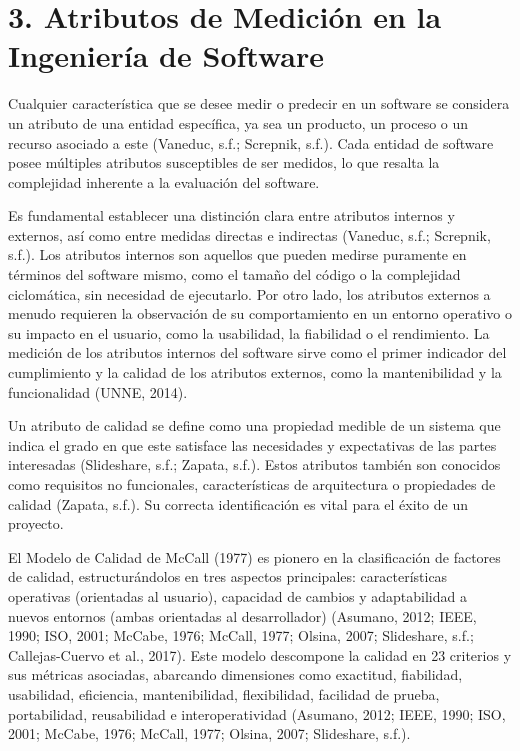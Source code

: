 \documentclass[11pt]{article}
\begin{document}
\section{3. Atributos de Medición en la Ingeniería de Software}

Cualquier característica que se desee medir o predecir en un software se considera un atributo de una entidad específica, ya sea un producto, un proceso o un recurso asociado a este (Vaneduc, s.f.; Screpnik, s.f.). Cada entidad de software posee múltiples atributos susceptibles de ser medidos, lo que resalta la complejidad inherente a la evaluación del software.

Es fundamental establecer una distinción clara entre atributos internos y externos, así como entre medidas directas e indirectas (Vaneduc, s.f.; Screpnik, s.f.). Los atributos internos son aquellos que pueden medirse puramente en términos del software mismo, como el tamaño del código o la complejidad ciclomática, sin necesidad de ejecutarlo. Por otro lado, los atributos externos a menudo requieren la observación de su comportamiento en un entorno operativo o su impacto en el usuario, como la usabilidad, la fiabilidad o el rendimiento. La medición de los atributos internos del software sirve como el primer indicador del cumplimiento y la calidad de los atributos externos, como la mantenibilidad y la funcionalidad (UNNE, 2014).

Un atributo de calidad se define como una propiedad medible de un sistema que indica el grado en que este satisface las necesidades y expectativas de las partes interesadas (Slideshare, s.f.; Zapata, s.f.). Estos atributos también son conocidos como requisitos no funcionales, características de arquitectura o propiedades de calidad (Zapata, s.f.). Su correcta identificación es vital para el éxito de un proyecto.

El Modelo de Calidad de McCall (1977) es pionero en la clasificación de factores de calidad, estructurándolos en tres aspectos principales: características operativas (orientadas al usuario), capacidad de cambios y adaptabilidad a nuevos entornos (ambas orientadas al desarrollador) (Asumano, 2012; IEEE, 1990; ISO, 2001; McCabe, 1976; McCall, 1977; Olsina, 2007; Slideshare, s.f.; Callejas-Cuervo et al., 2017). Este modelo descompone la calidad en 23 criterios y sus métricas asociadas, abarcando dimensiones como exactitud, fiabilidad, usabilidad, eficiencia, mantenibilidad, flexibilidad, facilidad de prueba, portabilidad, reusabilidad e interoperatividad (Asumano, 2012; IEEE, 1990; ISO, 2001; McCabe, 1976; McCall, 1977; Olsina, 2007; Slideshare, s.f.).
\end{document}
